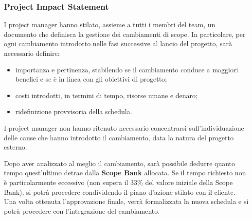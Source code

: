 \subsubsection{Project Impact Statement}
I project manager hanno stilato, assieme a tutti i membri del team, un documento che definisca la gestione dei cambiamenti di scope. In particolare, per ogni cambiamento introdotto nelle fasi successive al lancio del progetto, sarà necessario definire:
\begin{itemize}
    \item importanza e pertinenza, stabilendo se il cambiamento conduce a maggiori benefici e se è in linea con gli obiettivi di progetto;
    \item costi introdotti, in termini di tempo, risorse umane e denaro;
    \item ridefinizione provvisoria della schedula.
\end{itemize}
I project manager non hanno ritenuto necessario concentrarsi sull'individuazione delle cause che hanno introdotto il cambiamento, data la natura del progetto esterno.

Dopo aver analizzato al meglio il cambiamento, sarà possibile dedurre quanto tempo quest'ultimo detrae dalla \textbf{Scope Bank} allocata. Se il tempo richiesto non è particolarmente eccessivo (non supera il 33\% del valore iniziale della Scope Bank), si potrà procedere condividendo il piano d'azione stilato con il cliente. Una volta ottenuta l'approvazione finale, verrà formalizzata la nuova schedula e si potrà procedere con l'integrazione del cambiamento.